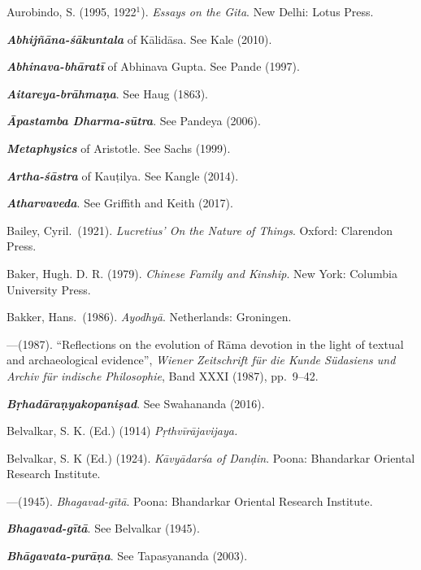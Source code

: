 \begin{thebibliography}{99}
\label{bibliography}
\itemsep=2pt
{Aurobindo, S.} (1995, 1922$^{1}$). {\sl Essays on the Gita}. New Delhi: Lotus Press. 

{\sl\bfseries Abhijñāna-śākuntala} of Kālidāsa. See Kale (2010). 

{\sl\bfseries Abhinava-bhāratī} of Abhinava Gupta. See Pande (1997).

{\sl\bfseries Aitareya-brāhmaṇa}. See Haug (1863).

{\sl\bfseries Āpastamba Dharma-sūtra}. See Pandeya (2006).

{\sl\bfseries Metaphysics} of Aristotle. See Sachs (1999).

{\sl\bfseries Artha-śāstra} of Kauṭilya. See Kangle (2014).  

{\sl\bfseries Atharvaveda}. See Griffith and Keith (2017).

Bailey, Cyril.\ (1921). {\sl Lucretius’ On the Nature of Things}. Oxford: Clarendon Press. 

Baker, Hugh. D. R. (1979). {\sl Chinese Family and Kinship}. New York: Columbia University Press. 

Bakker, Hans.\ (1986). {\sl Ayodhyā}. Netherlands: Groningen. 

---\kern3pt(1987). “Reflections on the evolution of Rāma devotion in the light of textual and archaeological evidence”, {\sl Wiener Zeitschrift für die Kunde Südasiens und Archiv für indische Philosophie}, Band XXXI (1987), pp.~9--42. 

{\sl\bfseries Bṛhadāraṇyakopaniṣad}. See Swahananda (2016).

Belvalkar, S. K. (Ed.) (1914) {\sl Pṛthvīrājavijaya.}

Belvalkar, S. K (Ed.) (1924). {\sl Kāvyādarśa of Danḍin}.  Poona: Bhandarkar Oriental Research Institute. 

---\kern3pt(1945). {\sl Bhagavad-gītā}. Poona: Bhandarkar Oriental Research Institute. 

{\sl\bfseries Bhagavad-gītā}. See Belvalkar (1945).

{\sl\bfseries Bhāgavata-purāṇa}. See Tapasyananda (2003). 


\end{thebibliography}
